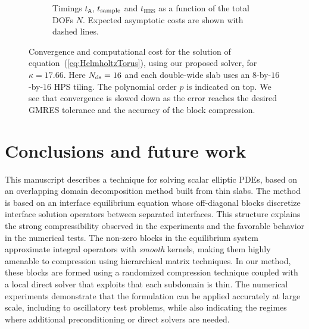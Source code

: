 \documentclass[final,onefignum,onetabnum]{siamart250211}
\newcommand{\mtx}[1]{\bm{\mathsf{#1}}}
\theoremstyle{definition}
\begin{document}
\begin{figure}
\begin{subfigure}[t]{.46\linewidth}
    \caption{Timings $t_{\mtx{A}}$, $t_{\rm sample}$ and $t_{\text{HBS}}$ as a function of the total DOFs $N$. Expected asymptotic costs are shown with dashed lines.}
    \end{subfigure}    
    \caption{Convergence and computational cost for the solution of equation~(\ref{eq:HelmholtzTorus}), using our proposed solver, for $\kappa = 17.66$. Here $N_{\rm ds} = 16$ and each double-wide slab uses an $8$-by-$16$-by-$16$ HPS tiling. The polynomial order $p$ is indicated on top. We see that convergence is slowed down as the error reaches the desired GMRES tolerance and the accuracy of the block compression.}
    \label{fig:waveGuideStats}
\end{figure}

\section{Conclusions and future work}
This manuscript describes a technique for solving scalar elliptic PDEs, based on an overlapping domain decomposition method built from thin slabs.
The method is based on an interface equilibrium equation whose off-diagonal blocks discretize interface solution operators between separated interfaces.  This structure explains the strong compressibility observed in the experiments and the favorable behavior in the numerical tests. The non-zero blocks in the equilibrium system approximate integral operators with \textit{smooth} kernels, making them highly amenable to compression using hierarchical matrix techniques.
In our method, these blocks are formed using a randomized compression technique coupled with a local direct solver that exploits that each subdomain is thin.
The numerical experiments demonstrate that the formulation can be applied accurately at large scale, including to oscillatory test problems, while also indicating the regimes where additional preconditioning or direct solvers are needed.
\end{document}

